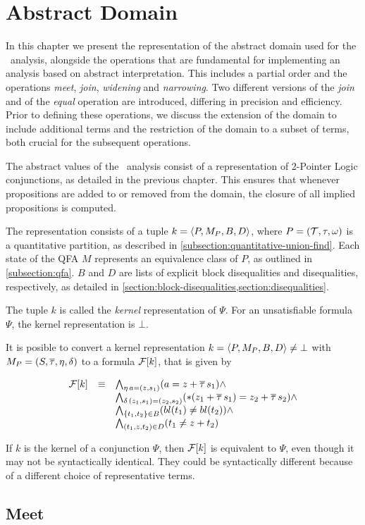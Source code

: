 \chapter{Abstract Domain}

In this chapter we present the representation of the abstract domain used for the \cpo\ analysis, alongside the operations that are fundamental for implementing an analysis based on abstract interpretation.
This includes a partial order and the operations \emph{meet}, \emph{join}, \emph{widening} and \emph{narrowing}.
Two different versions of the \emph{join} and of the \emph{equal} operation are introduced,
differing in precision and efficiency.
Prior to defining these operations, we discuss the extension of the domain to include additional terms and the restriction of the domain to a subset of terms,
both crucial for the subsequent operations.

The abstract values of the \cpo\ analysis consist of a representation
of 2-Pointer Logic conjunctions, as detailed in the previous chapter.
This ensures that whenever propositions are added to or removed from the domain,
the closure of all implied propositions is computed.

The representation consists of a tuple $k = \langle P,M_P,B,D\rangle$,
where $P = (\mathcal{T}, \tau, \omega)$ is a quantitative partition, as described in \cref{subsection:quantitative-union-find}.
Each state of the QFA $M$ represents an equivalence class of $P$, as outlined in \cref{subsection:qfa}.
$B$ and $D$ are lists of explicit block disequalities and disequalities, respectively, as detailed in \cref{section:block-disequalities,section:disequalities}.

The tuple $k$ is called the \emph{kernel} representation of $\Psi$.
For an unsatisfiable formula $\Psi$, the kernel representation is $\bot$.

It is posible to convert a kernel representation $k = \langle P,M_P,B,D\rangle \neq \bot$ with $M_P = (S, \overline{\tau}, \eta, \delta)$ to a formula $\mathcal{F}[k]$, that is given by

\[
\begin{array}{lll}
    \mathcal{F}[k] & \equiv & \bigwedge_{\eta\,a=(z,s_1)} (a = z + \overline{\tau}\,s_1) \land \\
    & & \bigwedge_{\delta\,(z_1,s_1)=(z_2,s_2)} (*(z_1 + \overline{\tau}\,s_1) = z_2 + \overline{\tau}\,s_2) \land \\
    & & \bigwedge_{\{t_1, t_2\} \in B} (bl(t_1) \neq bl(t_2)) \land \\
    & & \bigwedge_{(t_1, z, t_2) \in D} (t_1 \neq z + t_2)
\end{array}
\]

If $k$ is the kernel of a conjunction $\Psi$, then $\mathcal{F}[k]$ is equivalent to $\Psi$,
even though it may not be syntactically identical.
They could be syntactically different because of a different choice of representative terms.





\section{Meet}




